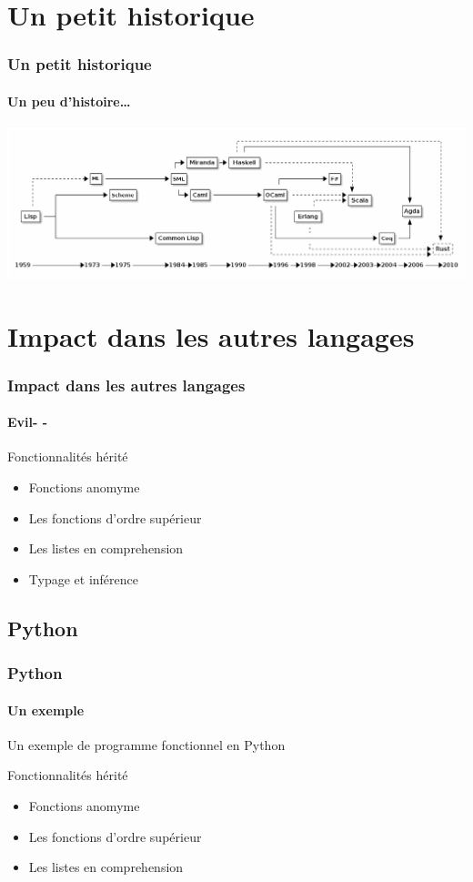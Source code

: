 \documentclass[t,12pt]{beamer}
\begin{document}
\section{Un petit historique}
\begin{frame}
  \frametitle{Un petit historique}
  \framesubtitle{Un peu d'histoire…}
  \includegraphics[scale=0.29]{history.png}
\end{frame}

\section{Impact dans les autres langages}
\begin{frame}
  \frametitle{Impact dans les autres langages}
  \framesubtitle{Evil- -}

  \begin{block}{Fonctionnalités hérité}
    \begin{itemize}
      \item Fonctions anomyme
      \item Les fonctions d'ordre supérieur
      \item Les listes en comprehension
      \item Typage et inférence
    \end{itemize}
  \end{block}
\end{frame}

\subsection{Python}
\begin{frame}
  \frametitle{Python}
  \framesubtitle{Un exemple}

  \begin{exampleblock}{Un exemple de programme fonctionnel en Python}
    \pythonExample
  \end{exampleblock}

  \begin{block}{Fonctionnalités hérité}
    \begin{itemize}
      \item Fonctions anomyme
      \item Les fonctions d'ordre supérieur
      \item Les listes en comprehension
    \end{itemize}
  \end{block}
\end{frame}
\end{document}
